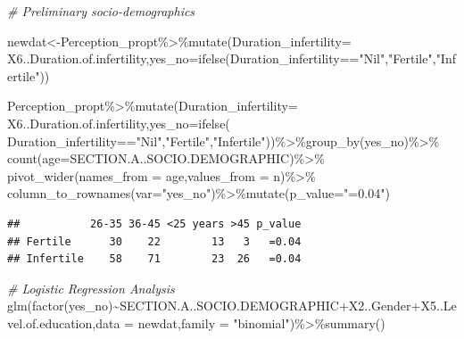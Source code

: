 \documentclass[
]{article}
\newenvironment{Shaded}{\begin{snugshade}}{\end{snugshade}}
\newcommand{\AttributeTok}[1]{\textcolor[rgb]{0.77,0.63,0.00}{#1}}
\newcommand{\CommentTok}[1]{\textcolor[rgb]{0.56,0.35,0.01}{\textit{#1}}}
\newcommand{\FunctionTok}[1]{\textcolor[rgb]{0.00,0.00,0.00}{#1}}
\newcommand{\NormalTok}[1]{#1}
\newcommand{\OtherTok}[1]{\textcolor[rgb]{0.56,0.35,0.01}{#1}}
\newcommand{\SpecialCharTok}[1]{\textcolor[rgb]{0.00,0.00,0.00}{#1}}
\newcommand{\StringTok}[1]{\textcolor[rgb]{0.31,0.60,0.02}{#1}}
\begin{document}
\begin{Shaded}
\begin{Highlighting}[]
\CommentTok{\# Preliminary socio{-}demographics }

\NormalTok{newdat}\OtherTok{\textless{}{-}}\NormalTok{Perception\_propt}\SpecialCharTok{\%\textgreater{}\%}\FunctionTok{mutate}\NormalTok{(}\AttributeTok{Duration\_infertility=}
\NormalTok{    X6..Duration.of.infertility,}\AttributeTok{yes\_no=}\FunctionTok{ifelse}\NormalTok{(Duration\_infertility}\SpecialCharTok{==}\StringTok{"Nil"}\NormalTok{,}\StringTok{"Fertile"}\NormalTok{,}\StringTok{"Infertile"}\NormalTok{))}

\NormalTok{Perception\_propt}\SpecialCharTok{\%\textgreater{}\%}\FunctionTok{mutate}\NormalTok{(}\AttributeTok{Duration\_infertility=}
\NormalTok{  X6..Duration.of.infertility,}\AttributeTok{yes\_no=}\FunctionTok{ifelse}\NormalTok{(}
\NormalTok{  Duration\_infertility}\SpecialCharTok{==}\StringTok{"Nil"}\NormalTok{,}\StringTok{"Fertile"}\NormalTok{,}\StringTok{"Infertile"}\NormalTok{))}\SpecialCharTok{\%\textgreater{}\%}\FunctionTok{group\_by}\NormalTok{(yes\_no)}\SpecialCharTok{\%\textgreater{}\%}
  \FunctionTok{count}\NormalTok{(}\AttributeTok{age=}\NormalTok{SECTION.A..SOCIO.DEMOGRAPHIC)}\SpecialCharTok{\%\textgreater{}\%}
  \FunctionTok{pivot\_wider}\NormalTok{(}\AttributeTok{names\_from =}\NormalTok{ age,}\AttributeTok{values\_from =}\NormalTok{ n)}\SpecialCharTok{\%\textgreater{}\%}
  \FunctionTok{column\_to\_rownames}\NormalTok{(}\AttributeTok{var=}\StringTok{"yes\_no"}\NormalTok{)}\SpecialCharTok{\%\textgreater{}\%}\FunctionTok{mutate}\NormalTok{(}\AttributeTok{p\_value=}\StringTok{"=0.04"}\NormalTok{)}
\end{Highlighting}
\end{Shaded}

\begin{verbatim}
##           26-35 36-45 <25 years >45 p_value
## Fertile      30    22        13   3   =0.04
## Infertile    58    71        23  26   =0.04
\end{verbatim}

\begin{Shaded}
\begin{Highlighting}[]
\CommentTok{\# Logistic Regression Analysis}
\FunctionTok{glm}\NormalTok{(}\FunctionTok{factor}\NormalTok{(yes\_no)}\SpecialCharTok{\textasciitilde{}}\NormalTok{SECTION.A..SOCIO.DEMOGRAPHIC}\SpecialCharTok{+}\NormalTok{X2..Gender}\SpecialCharTok{+}\NormalTok{X5..Level.of.education,}\AttributeTok{data =}\NormalTok{ newdat,}\AttributeTok{family =} \StringTok{"binomial"}\NormalTok{)}\SpecialCharTok{\%\textgreater{}\%}\FunctionTok{summary}\NormalTok{()}
\end{Highlighting}
\end{Shaded}
\end{document}
